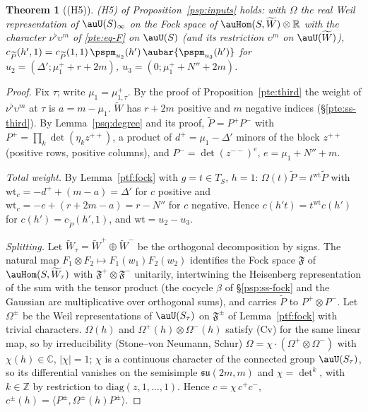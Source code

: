 \documentclass[10pt]{amsart}
\newtheorem{theorem}{Theorem}[section]
\theoremstyle{definition}
\theoremstyle{remark}
\newcommand{\C}{\mathbb C}
\newcommand{\R}{\mathbb R}
\newcommand{\Z}{\mathbb Z}
\begin{document}
\begin{theorem}[(H5)]\label{pss:H5}
\textup{(H5)} of Proposition~\ref{psp:inputs} holds: with $\Omega$ the real Weil representation of
$\auU(S)_\infty$ on the Fock space of $\auHom(S,\widetilde W)\otimes\R$ with the character
$\nu^\flat\upsilon^m$ of \eqref{pte:eq-F} on $\auU(S)$ \textup(and its restriction $\upsilon^m$ on
$\auU(\widetilde W)$\textup), $c_{\widetilde P}(h',1)=c_{\widetilde P}(1,1)\,\pspm_{u_2}(h')\,\aubar{\pspm_{u_3}(h')}$ for
$u_2=(\Delta';\mu^+_1+r+2m)$, $u_3=(0;\mu^+_1+N''+2m)$.
\end{theorem}
\begin{proof}
Fix $\tau$; write $\mu_1=\mu^+_{1,\tau}$. By the proof of Proposition~\ref{pte:third} the weight of
$\nu^\flat\upsilon^m$ at $\tau$ is $a=m-\mu_1$. $\widetilde W$ has $r+2m$ positive and $m$ negative indices
(\S\ref{pte:ss-third}). By Lemma~\ref{psq:degree} and its proof,
$\widetilde P=P^+P^-$ with $P^+=\prod_{k}\det(\eta_kz^{++})$, a product of $d^+=\mu_1-\Delta'$ minors of the block
$z^{++}$ (positive rows, positive columns), and $P^-=\det(z^{--})^e$, $e=\mu_1+N''+m$.

\emph{Total weight.} By Lemma~\ref{ptf:fock} with $g=t\in T_S$, $h=1$: $\Omega(t)\widetilde P=t^{\mathrm{wt}}\widetilde P$ with
$\mathrm{wt}_c=-d^++(m-a)=\Delta'$ for $c$ positive and $\mathrm{wt}_c=-e+(r+2m-a)=r-N''$ for $c$ negative. Hence
$c(h't)=t^{\mathrm{wt}}c(h')$ for $c(h')=c_{\widetilde P}(h',1)$, and $\mathrm{wt}=u_2-u_3$.

\emph{Splitting.} Let $\widetilde W_\tau=\widetilde W^+\oplus\widetilde W^-$ be the orthogonal decomposition by signs.
The natural map $F_1\otimes F_2\mapsto F_1(w_1)F_2(w_2)$ identifies the Fock space $\mathfrak F$ of
$\auHom(S,\widetilde W_\tau)$ with $\mathfrak F^+\otimes\mathfrak F^-$ unitarily, intertwining the Heisenberg
representation of the sum with the tensor product (the cocycle $\beta$ of \S\ref{psp:ss-fock} and the
Gaussian are multiplicative over orthogonal sums), and carries $\widetilde P$ to $P^+\otimes P^-$. Let
$\Omega^\pm$ be the Weil representations of $\auU(S_\tau)$ on $\mathfrak F^\pm$ of Lemma~\ref{ptf:fock} with
trivial characters. $\Omega(h)$ and $\Omega^+(h)\otimes\Omega^-(h)$ satisfy (Cv) for the same linear map,
so by irreducibility (Stone--von Neumann, Schur) $\Omega=\chi\cdot(\Omega^+\otimes\Omega^-)$ with
$\chi(h)\in\C$, $|\chi|=1$; $\chi$ is a continuous character of the connected group $\auU(S_\tau)$, so its
differential vanishes on the semisimple $\mathfrak{su}(2m,m)$ and $\chi=\det^k$, with $k\in\Z$ by restriction
to $\mathrm{diag}(z,1,\dots,1)$. Hence $c=\chi\,c^+c^-$, $c^\pm(h)=\langle P^\pm,\Omega^\pm(h)P^\pm\rangle$.


\end{proof}
\end{document}
